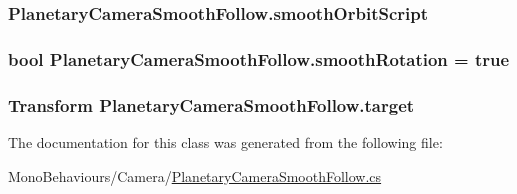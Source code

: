 \subsubsection[{\texorpdfstring{smooth\+Orbit\+Script}{smoothOrbitScript}}]{ Planetary\+Camera\+Smooth\+Follow.\+smooth\+Orbit\+Script}\hypertarget{class_planetary_camera_smooth_follow_a25f9a9fa0f51bd1fb3b794cc4029a67e}{}\label{class_planetary_camera_smooth_follow_a25f9a9fa0f51bd1fb3b794cc4029a67e}
\subsubsection[{\texorpdfstring{smooth\+Rotation}{smoothRotation}}]{\setlength{\rightskip}{0pt plus 5cm}bool Planetary\+Camera\+Smooth\+Follow.\+smooth\+Rotation = true}\hypertarget{class_planetary_camera_smooth_follow_ad8e7f74b3a8fa5ddad015dba2000c3c7}{}\label{class_planetary_camera_smooth_follow_ad8e7f74b3a8fa5ddad015dba2000c3c7}
\subsubsection[{\texorpdfstring{target}{target}}]{\setlength{\rightskip}{0pt plus 5cm}Transform Planetary\+Camera\+Smooth\+Follow.\+target}\hypertarget{class_planetary_camera_smooth_follow_ad761466f05019f8e678004773322a31e}{}\label{class_planetary_camera_smooth_follow_ad761466f05019f8e678004773322a31e}


The documentation for this class was generated from the following file\+:\begin{DoxyCompactItemize}
\item 
Mono\+Behaviours/\+Camera/\hyperlink{_planetary_camera_smooth_follow_8cs}{Planetary\+Camera\+Smooth\+Follow.\+cs}\end{DoxyCompactItemize}
